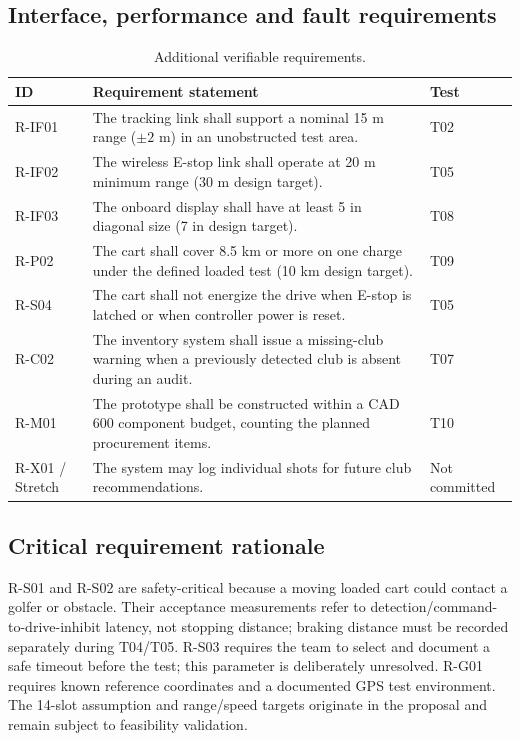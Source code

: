\subsection{Interface, performance and fault requirements}
\begin{table}[ht]\centering\scriptsize\caption{Additional verifiable requirements.}\begin{tabularx}{\linewidth}{p{.16\linewidth}X p{.12\linewidth}}\toprule ID & Requirement statement & Test\\\midrule
R-IF01 & The tracking link shall support a nominal 15 m range ($\pm2$ m) in an unobstructed test area. & T02\\
R-IF02 & The wireless E-stop link shall operate at 20 m minimum range (30 m design target). & T05\\
R-IF03 & The onboard display shall have at least 5 in diagonal size (7 in design target). & T08\\
R-P02 & The cart shall cover 8.5 km or more on one charge under the defined loaded test (10 km design target). & T09\\
R-S04 & The cart shall not energize the drive when E-stop is latched or when controller power is reset. & T05\\
R-C02 & The inventory system shall issue a missing-club warning when a previously detected club is absent during an audit. & T07\\
R-M01 & The prototype shall be constructed within a CAD 600 component budget, counting the planned procurement items. & T10\\
R-X01 / Stretch & The system may log individual shots for future club recommendations. & Not committed\\
\bottomrule\end{tabularx}\end{table}
\subsection{Critical requirement rationale}
R-S01 and R-S02 are safety-critical because a moving loaded cart could contact a golfer or obstacle. Their acceptance measurements refer to detection/command-to-drive-inhibit latency, not stopping distance; braking distance must be recorded separately during T04/T05. R-S03 requires the team to select and document a safe timeout before the test; this parameter is deliberately unresolved. R-G01 requires known reference coordinates and a documented GPS test environment. The 14-slot assumption and range/speed targets originate in the proposal and remain subject to feasibility validation.\par
